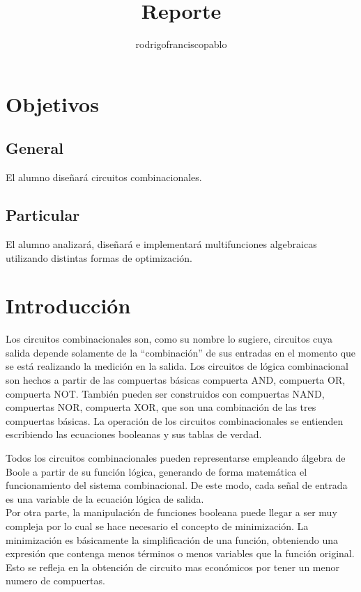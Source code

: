 \documentclass{mylib/reporteConCalif}
\title{Reporte}
\author{rodrigofranciscopablo }
\begin{document}
\coverPage


\section{Objetivos}

\subsection{General}

El alumno diseñará circuitos combinacionales.

\subsection{Particular}

El alumno analizará, diseñará e implementará multifunciones algebraicas utilizando distintas formas
de optimización.

\section{Introducción}

Los circuitos combinacionales son, como su nombre lo sugiere, circuitos cuya salida depende solamente de la “combinación” de sus entradas en el momento que se está realizando la medición en la salida.
Los circuitos de lógica combinacional son hechos a partir de las compuertas básicas compuerta AND, compuerta OR, compuerta NOT. También pueden ser construidos con compuertas NAND, compuertas NOR, compuerta XOR, que son una combinación de las tres compuertas básicas.
La operación de los circuitos combinacionales se entienden escribiendo las ecuaciones booleanas y sus tablas de verdad.

Todos los circuitos combinacionales pueden representarse empleando álgebra de Boole a partir de su función lógica, generando de forma matemática el funcionamiento del sistema combinacional. De este modo, cada señal de entrada es una variable de la ecuación lógica de salida. \\

Por otra parte, la manipulación de funciones booleana puede llegar a ser muy compleja por lo cual se hace necesario el concepto de minimización. La minimización es básicamente la simplificación de una función, obteniendo una expresión que contenga menos términos o menos variables que la función original.  Esto se refleja en la obtención de circuito mas económicos por tener un menor numero de compuertas.
\end{document}
